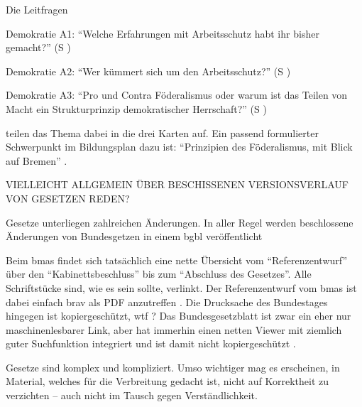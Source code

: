 Die Leitfragen
\begin{myenumerate}
    \item Demokratie A1: \enquote{Welche Erfahrungen mit Arbeitsschutz habt ihr bisher gemacht?} (\gls{S} \pageref{DEMOKRATIE-A1})
    \item Demokratie A2: \enquote{Wer kümmert sich um den Arbeitsschutz?} (\gls{S} \pageref{DEMOKRATIE-A2})
    \item Demokratie A3: \enquote{Pro und Contra Föderalismus oder warum ist das Teilen von Macht ein Strukturprinzip demokratischer Herrschaft?} (\gls{S} \pageref{DEMOKRATIE-A3})
\end{myenumerate}
teilen das Thema dabei in die drei Karten auf.
Ein passend formulierter Schwerpunkt im Bildungsplan dazu ist: \enquote{Prinzipien des Föderalismus, mit Blick auf Bremen} \autocite[16]{bplan}.


VIELLEICHT ALLGEMEIN ÜBER BESCHISSENEN VERSIONSVERLAUF VON GESETZEN REDEN?

Gesetze unterliegen zahlreichen Änderungen. In aller Regel werden beschlossene Änderungen von Bundesgetzen in einem \gls{bgbl} veröffentlicht  


Beim \gls{bmas} findet sich tatsächlich eine nette Übersicht vom \enquote{Referenzentwurf} über den \enquote{Kabinettsbeschluss} bis zum \enquote{Abschluss des Gesetzes}.
Alle Schriftstücke sind, wie es sein sollte, verlinkt. Der Referenzentwurf vom \gls{bmas} ist dabei einfach brav als PDF anzutreffen \autocite{BMAS-21.07.2020}. 
Die Drucksache des Bundestages hingegen ist kopiergeschützt, wtf \autocite{Bundestag.31.08.2020}?
Das Bundesgesetzblatt ist zwar ein eher nur maschinenlesbarer Link, aber hat immerhin einen netten Viewer mit ziemlich guter Suchfunktion integriert und ist damit nicht kopiergeschützt \autocite{BGBl.2020-I-Nr67}. 

Gesetze sind komplex und kompliziert. Umso wichtiger mag es erscheinen, in Material, welches für die Verbreitung gedacht ist, nicht auf Korrektheit zu verzichten -- auch nicht im Tausch gegen Verständlichkeit.






